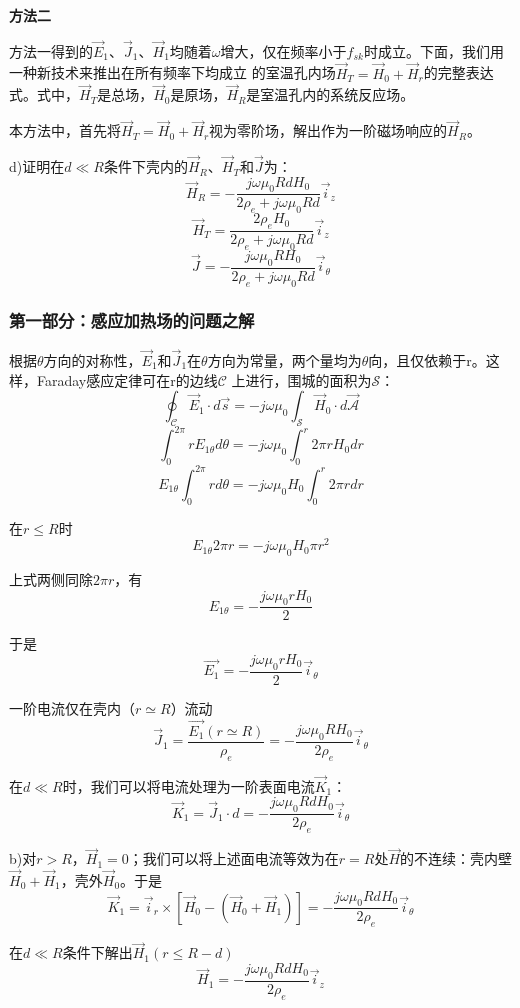 \textbf{方法二}

方法一得到的$\vec{E}_1$、$\vec{J}_1$、$\vec{H}_1$均随着$\omega$增大，仅在频率小于$f_{sk}$时成立。下面，我们用一种新技术来推出在所有频率下均成立
的室温孔内场$\vec{H}_T=\vec{H}_0+\vec{H}_r$的完整表达式。式中，$\vec{H}_T$是总场，$\vec{H}_0$是原场，$\vec{H}_R$是室温孔内的系统反应场。

本方法中，首先将$\vec{H}_T=\vec{H}_0+\vec{H}_r$视为零阶场，解出作为一阶磁场响应的$\vec{H}_R$。

d)证明在$d\ll R$条件下壳内的$\vec{H}_R$、$\vec{H}_T$和$\vec{J}$为：
$$\vec{H}_R=-\frac{j\omega \mu_0 R d H_0}{2\rho_e+j\omega \mu_0 R d} \vec{i}_z$$
$$\vec{H}_T=\frac{2\rho_e H_0}{2\rho_e+j\omega \mu_0 R d} \vec{i}_z$$
$$\vec{J}=-\frac{j\omega \mu_0 R H_0}{2\rho_e+j\omega \mu_0 R d} \vec{i}_\theta$$

\subsubsection*{第一部分：感应加热场的问题之解}
根据$\theta$方向的对称性，$\vec{E}_1$和$\vec{J}_1$在$\theta$方向为常量，两个量均为$\theta$向，且仅依赖于r。这样，Faraday感应定律可在r的边线$\mathcal{C}$
上进行，围城的面积为$\mathcal{S}$：
$$\oint_{\mathcal{C}} \vec{E}_1 \cdot d\vec{s}=-j\omega \mu_0 \int_{\mathcal{S}} \vec{H}_0 \cdot d\vec{\mathcal{A}}$$
$$\int_{0}^{2\pi} r E_{1\theta} d\theta=-j\omega \mu_0 \int_{0}^{r} 2\pi r H_0 dr$$
$$E_{1\theta}\int_{0}^{2\pi} r d\theta=-j\omega \mu_0 H_0\int_{0}^{r} 2\pi r dr$$

在$r\le R$时
$$E_{1\theta} 2\pi r = -j\omega \mu_0 H_0 \pi r^2$$

上式两侧同除$2\pi r$，有
$$E_{1\theta} = -\frac{j\omega \mu_0 r H_0}{2}$$

于是
$$\vec{E_{1}} = -\frac{j\omega \mu_0 r H_0}{2}\vec{i}_\theta$$

一阶电流仅在壳内（$r\simeq R$）流动
$$\vec{J}_1=\frac{\vec{E_{1}}(r\simeq R)}{\rho_e} = -\frac{j\omega \mu_0 R H_0}{2\rho_e}\vec{i}_\theta$$

在$d\ll R$时，我们可以将电流处理为一阶表面电流$\vec{K}_1$：
$$\vec{K}_1=\vec{J}_1 \cdot d= -\frac{j\omega \mu_0 R d H_0}{2\rho_e}\vec{i}_\theta$$

b)对$r>R$，$\vec{H}_1=0$；我们可以将上述面电流等效为在$r=R$处$\vec{H}$的不连续：壳内壁$\vec{H}_0+\vec{H}_1$，壳外$\vec{H}_0$。于是
$$\vec{K}_1=\vec{i}_r \times [\vec{H}_0-(\vec{H}_0+\vec{H}_1)]=-\frac{j\omega \mu_0 R d H_0}{2\rho_e}\vec{i}_\theta$$

在$d\ll R$条件下解出$\vec{H}_1(r\le R-d)$
$$\vec{H}_1=-\frac{j\omega \mu_0 R d H_0}{2\rho_e}\vec{i}_z$$

